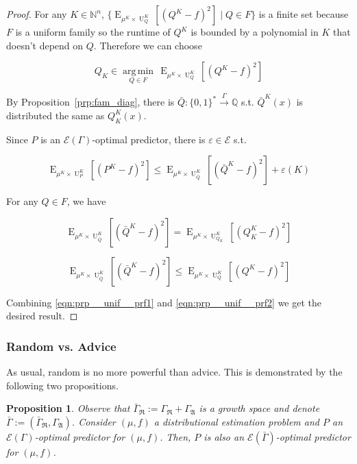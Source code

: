 \documentclass{article}
\numberwithin{equation}{section}
\theoremstyle{definition}
\theoremstyle{plain}
\newtheorem{proposition}{Proposition}[section]
\newcommand{\Bool}{\{0,1\}}
\newcommand{\Words}{{\Bool^*}}
\DeclareMathOperator{\E}{E}
\DeclareMathOperator{\Un}{U}
\newcommand{\Argmin}[1]{\underset{#1}{\operatorname{arg\,min}}\,}
\newcommand{\Nats}{\mathbb{N}}
\newcommand{\Rats}{\mathbb{Q}}
\newcommand{\GrowR}{\Gamma_{\mathfrak{R}}}
\newcommand{\GrowA}{\Gamma_{\mathfrak{A}}}
\newcommand{\Fall}{\mathcal{E}}
\newcommand{\EG}{\Fall(\Gamma)}
\newcommand{\Scheme}{\xrightarrow{\Gamma}}
\begin{document}
\begin{proof}

For any $K \in \Nats^n$, $\{\E_{\mu^{K} \times \Un_Q^{K}}[(Q^{K} - f)^2] \mid Q \in F\}$ is a finite set because $F$ is a uniform family so the runtime of $Q^{K}$ is bounded by a polynomial in $K$ that doesn't depend on $Q$. Therefore we can choose 

\[Q_{K} \in \Argmin{Q \in F} \E_{\mu^{K} \times \Un_Q^{K}}[(Q^{K} - f)^2]\]

By Proposition~\ref{prp:fam_diag}, there is $\bar{Q}: \Words \Scheme \Rats$ s.t. $\bar{Q}^{K}(x)$ is distributed the same as $Q_{K}^{K}(x)$.

Since $P$ is an $\EG$-optimal predictor, there is $\varepsilon \in \Fall$ s.t.

\begin{equation}
\label{eqn:prp__unif__prf1}
\E_{\mu^{K} \times \Un_P^{K}}[(P^{K} - f)^2] \leq \E_{\mu^{K} \times \Un_{\bar{Q}}^{K}}[(\bar{Q}^{K} - f)^2] + \varepsilon(K)
\end{equation}

For any $Q \in F$, we have 

$$\E_{\mu^{K} \times \Un_{\bar{Q}}^{K}}[(\bar{Q}^{K} - f)^2]=\E_{\mu^{K} \times \Un_{Q_{K}}^{K}}[(Q_{K}^{K} - f)^2]$$

\begin{equation}
\label{eqn:prp__unif__prf2}
\E_{\mu^{K} \times \Un_{\bar{Q}}^{K}}[(\bar{Q}^{K} - f)^2] \leq \E_{\mu^{K} \times \Un_Q^{K}}[(Q^{K} - f)^2]
\end{equation}

Combining \ref{eqn:prp__unif__prf1} and \ref{eqn:prp__unif__prf2} we get the desired result.
\end{proof}

\subsubsection{Random vs. Advice}

As usual, random is no more powerful than advice. This is demonstrated by the following two propositions.

\begin{proposition}

Observe that $\bar{\Gamma}_{\mathfrak{R}}:=\GrowR+\GrowA$ is a growth space and denote $\bar{\Gamma}:=(\bar{\Gamma}_{\mathfrak{R}},\GrowA)$. Consider $(\mu,f)$ a distributional estimation problem and $P$ an $\EG$-optimal predictor for $(\mu,f)$. Then, $P$ is also an $\Fall(\bar{\Gamma})$-optimal predictor for $(\mu,f)$.

\end{proposition}
\end{document}
